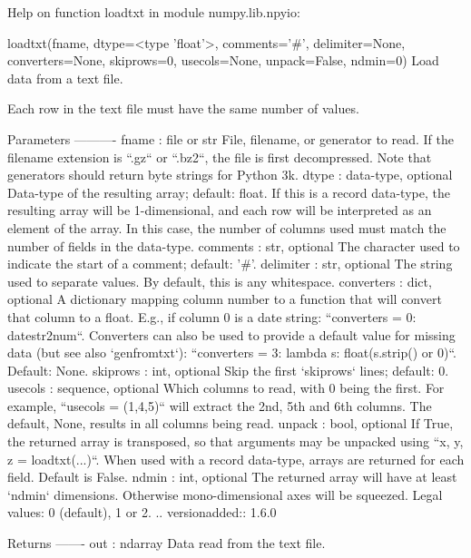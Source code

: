 \begin{VerbOut}
Help on function loadtxt in module numpy.lib.npyio:

loadtxt(fname, dtype=<type 'float'>, comments='#', delimiter=None, converters=None, skiprows=0, usecols=None, unpack=False, ndmin=0)
    Load data from a text file.

    Each row in the text file must have the same number of values.

    Parameters
    ----------
    fname : file or str
        File, filename, or generator to read.  If the filename extension is
        ``.gz`` or ``.bz2``, the file is first decompressed. Note that
        generators should return byte strings for Python 3k.
    dtype : data-type, optional
        Data-type of the resulting array; default: float.  If this is a
        record data-type, the resulting array will be 1-dimensional, and
        each row will be interpreted as an element of the array.  In this
        case, the number of columns used must match the number of fields in
        the data-type.
    comments : str, optional
        The character used to indicate the start of a comment;
        default: '#'.
    delimiter : str, optional
        The string used to separate values.  By default, this is any
        whitespace.
    converters : dict, optional
        A dictionary mapping column number to a function that will convert
        that column to a float.  E.g., if column 0 is a date string:
        ``converters = {0: datestr2num}``.  Converters can also be used to
        provide a default value for missing data (but see also `genfromtxt`):
        ``converters = {3: lambda s: float(s.strip() or 0)}``.  Default: None.
    skiprows : int, optional
        Skip the first `skiprows` lines; default: 0.
    usecols : sequence, optional
        Which columns to read, with 0 being the first.  For example,
        ``usecols = (1,4,5)`` will extract the 2nd, 5th and 6th columns.
        The default, None, results in all columns being read.
    unpack : bool, optional
        If True, the returned array is transposed, so that arguments may be
        unpacked using ``x, y, z = loadtxt(...)``.  When used with a record
        data-type, arrays are returned for each field.  Default is False.
    ndmin : int, optional
        The returned array will have at least `ndmin` dimensions.
        Otherwise mono-dimensional axes will be squeezed.
        Legal values: 0 (default), 1 or 2.
        .. versionadded:: 1.6.0

    Returns
    -------
    out : ndarray
        Data read from the text file.


\end{VerbOut}
